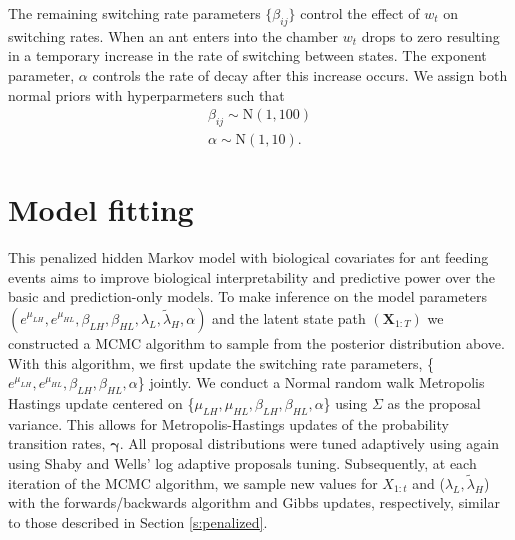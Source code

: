 \documentclass[cmbright,fleqn,referee]{envauth}
\begin{document}
The remaining switching rate parameters $\{\beta_{ij}\}$ control the effect of $w_t$ on switching rates. When an ant enters into the chamber $w_t$ drops to zero resulting in a temporary increase in the rate of switching between states. The exponent parameter, $\alpha$ controls the rate of decay after this increase occurs. We assign both normal priors with hyperparmeters such that
\begin{equation}
\begin{aligned}
\beta_{ij} \sim \text{N}(1, 100)\\
\alpha \sim \text{N}(1, 10).
\end{aligned}
\end{equation}
\section{Model fitting}
This penalized hidden Markov model with biological covariates for ant feeding events aims to improve biological interpretability and predictive power over the basic and prediction-only models. To make inference on the model parameters $(e^{\mu_{LH}}, e^{\mu_{HL}}, \beta_{LH}, \beta_{HL}, \lambda_L, \tilde{\lambda}_H, \alpha)$ and the latent state path $(\mathbf{X}_{1:T})$ we constructed a MCMC algorithm to sample from the posterior distribution above. With this algorithm, we first update the switching rate parameters, \{$e^{\mu_{LH}}, e^{\mu_{HL}}, \beta_{LH}, \beta_{HL}, \alpha$\} jointly. We conduct a Normal random walk Metropolis Hastings update centered on \{$\mu_{LH}, \mu_{HL}, \beta_{LH}, \beta_{HL}, \alpha$\} using $\Sigma$ as the proposal variance. This allows for Metropolis-Hastings updates of the probability transition rates, $\bm{\gamma}$. All proposal distributions were tuned adaptively using again using Shaby and Wells' log adaptive proposals tuning. Subsequently, at each iteration of the MCMC algorithm, we sample new values for $X_{1:t}$ and ($\lambda_L, \tilde{\lambda}_H$) with the forwards/backwards algorithm and Gibbs updates, respectively, similar to those described in Section \ref{s:penalized}. 
\end{document}
